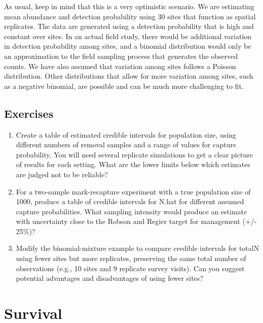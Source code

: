\documentclass[
]{krantz}
\begin{document}
As usual, keep in mind that this is a very optimistic scenario. We are estimating mean abundance and detection probability using 30 sites that function as spatial replicates. The data are generated using a detection probability that is high and constant over sites. In an actual field study, there would be additional variation in detection probability among sites, and a binomial distribution would only be an approximation to the field sampling process that generates the observed counts. We have also assumed that variation among sites follows a Poisson distribution. Other distributions that allow for more variation among sites, such as a negative binomial, are possible and can be much more challenging to fit.

\hypertarget{exercises-2}{%
\section{Exercises}\label{exercises-2}}

\begin{enumerate}
\def\labelenumi{\arabic{enumi}.}
\item
  Create a table of estimated credible intervals for population size, using different numbers of removal samples and a range of values for capture probability. You will need several replicate simulations to get a clear picture of results for each setting. What are the lower limits below which estimates are judged not to be reliable?
\item
  For a two-sample mark-recapture experiment with a true population size of 1000, produce a table of credible intervals for N.hat for different assumed capture probabilities. What sampling intensity would produce an estimate with uncertainty close to the Robson and Regier target for management (+/- 25\%)?
\item
  Modify the binomial-mixture example to compare credible intervals for totalN using fewer sites but more replicates, preserving the same total number of observations (e.g., 10 sites and 9 replicate survey visits). Can you suggest potential advantages and disadvantages of using fewer sites?
\end{enumerate}

\hypertarget{Survival}{%
\chapter{Survival}\label{Survival}}
\end{document}
